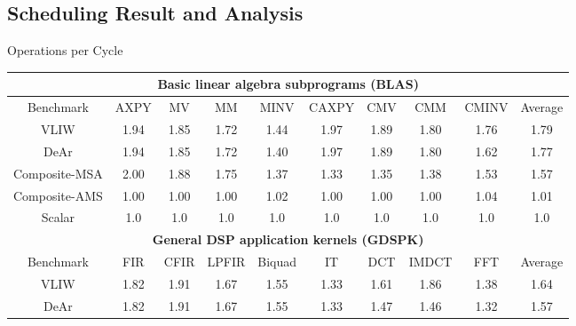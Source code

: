 \documentclass[handout]{beamer}
\begin{document}
\begin{CJK}{UTF8}{bkai}
            \subsection{Scheduling Result and Analysis}

            \begin{frame}{Operations per Cycle}
                \vspace{-2em}
                \begin{table}[!ht]
                    \centering
                    \resizebox{\columnwidth}{!}
                    {
                        \begin{tabular}{|c|c|c|c|c|c|c|c|c|c|}
                            \hline
                            \multicolumn{10}{|c|}{\textbf{Basic linear algebra subprograms (BLAS)}} \\ \hline
                            Benchmark  &  AXPY  &  MV  &  MM  &  MINV  &  CAXPY  &  CMV  &  CMM  &  CMINV  &  Average \\ \hline 
                            VLIW  &   1.94  &   1.85  &   1.72  &   1.44  &   1.97  &   1.89  &   1.80  &   1.76  &   1.79     \\ \hline 
                            DeAr  &   1.94  &   1.85  &   1.72  &   1.40  &   1.97  &   1.89  &   1.80  &   1.62  &   1.77     \\ \hline
                            Composite-MSA  &   2.00  &   1.88  &   1.75  &   1.37  &   1.33  &   1.35  &   1.38  &   1.53  &   1.57     \\ \hline 
                            Composite-AMS  &   1.00  &   1.00  &   1.00  &   1.02  &   1.00  &   1.00  &   1.00  &   1.04  &   1.01     \\ \hline 
                            Scalar  & 1.0  & 1.0  & 1.0  & 1.0  & 1.0  & 1.0  & 1.0  & 1.0  & 1.0 \\ \hline 
                            \multicolumn{10}{|c|}{\textbf{General DSP application kernels (GDSPK)}}                     \\ \hline
                            Benchmark  &  FIR  &  CFIR  &  LPFIR  &  Biquad  &  IT  &  DCT  &  IMDCT  &  FFT  &  Average \\ \hline 
                            VLIW  &   1.82  &   1.91  &   1.67  &   1.55  &   1.33  &   1.61  &   1.86  &   1.38  &   1.64     \\ \hline 
                            DeAr  &   1.82  &   1.91  &   1.67  &   1.55  &   1.33  &   1.47  &   1.46  &   1.32  &   1.57     \\ \hline 

\end{tabular}}
\end{table}
\end{frame}
\end{CJK}
\end{document}
